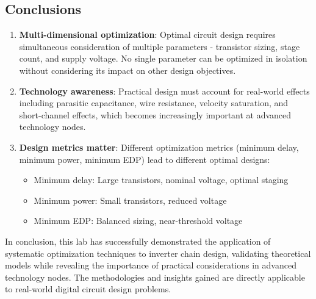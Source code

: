 \documentclass[UTF8,12pt,a4paper]{ctexart}
\begin{document}
\subsection{Conclusions}

\begin{enumerate}
    \item \textbf{Multi-dimensional optimization}: Optimal circuit design requires simultaneous consideration of multiple parameters - transistor sizing, stage count, and supply voltage. No single parameter can be optimized in isolation without considering its impact on other design objectives.
    
    \item \textbf{Technology awareness}: Practical design must account for real-world effects including parasitic capacitance, wire resistance, velocity saturation, and short-channel effects, which becomes increasingly important at advanced technology nodes.
    
    \item \textbf{Design metrics matter}: Different optimization metrics (minimum delay, minimum power, minimum EDP) lead to different optimal designs:
    \begin{itemize}
        \item Minimum delay: Large transistors, nominal voltage, optimal staging
        \item Minimum power: Small transistors, reduced voltage
        \item Minimum EDP: Balanced sizing, near-threshold voltage
    \end{itemize}
\end{enumerate}

In conclusion, this lab has successfully demonstrated the application of systematic optimization techniques to inverter chain design, validating theoretical models while revealing the importance of practical considerations in advanced technology nodes. The methodologies and insights gained are directly applicable to real-world digital circuit design problems.
\end{document}
